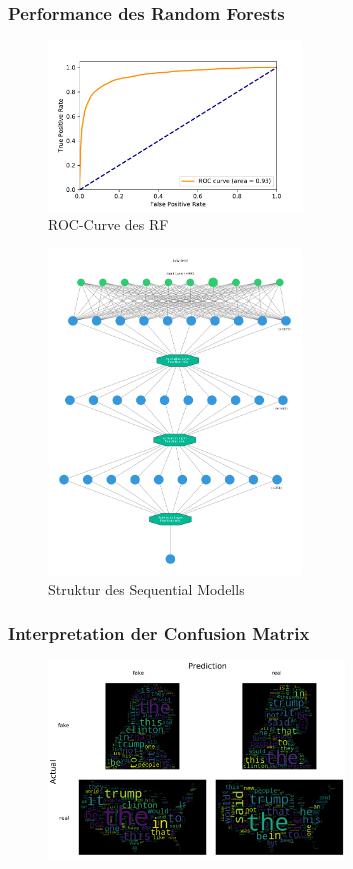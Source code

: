 \documentclass[aspectratio=1610, professionalfonts, 9pt]{beamer}
\begin{document}
  \begin{frame}
    \frametitle{Performance des Random Forests}
    \begin{figure}
        \includegraphics[width=0.6\textwidth]{pictures/bow/RF/roc_Hyperopt_bow_best_nn.pdf}
        \caption{ROC-Curve des RF}
        \label{}
    \end{figure}
  \end{frame}
  \begin{frame}
    \begin{figure}
        \includegraphics[angle=90,width=0.6\textwidth]{pictures/bow/bow_dnn_graph.pdf}
        \caption{Struktur des Sequential Modells}
        \label{}
    \end{figure}
  \end{frame}
  \begin{frame}
    \frametitle{Interpretation der Confusion Matrix}
    \begin{figure}
      \includegraphics[width=0.7\textwidth]{pictures/bow/cnfn_wordcloud.pdf}
      \label{}
    \end{figure}
  \end{frame}
  \begin{frame}
    \printbibliography
  \end{frame}
\end{document}
